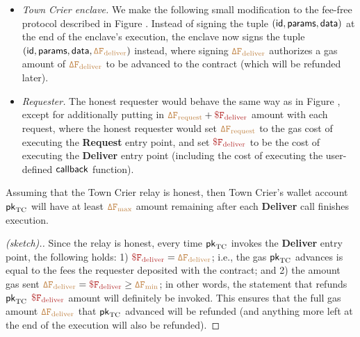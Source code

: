 \begin{itemize}[leftmargin=5mm]
\item
{\it Town Crier enclave.}
We make the following small modification to the fee-free protocol
described in Figure .
Instead of signing the tuple $({\sf id}, {\sf params}, {\sf data})$
at the end of the enclave's execution, the enclave now signs 
the tuple $({\sf id}, {\sf params}, {\sf data}, 
\tt {\color{brown} \Delta F_{\text{deliver}} })$
instead, where signing 
$\tt {\color{brown} \Delta F_{\text{deliver}} }$ authorizes a
gas amount of $\tt {\color{brown} \Delta F_{\text{deliver}} }$ to be advanced
to the contract (which will be refunded later).
\item
{\it Requester.}
The honest requester would behave the same way as in Figure ,
except for additionally putting 
in $\sbrown{\Delta F_{\text{request}}} + \smaroon{\$ F_{\text{deliver}}}$ 
amount with each request, 
where the honest 
requester would set  
$\tt {\color{brown} \Delta F_{\text{request}} }$
to the gas cost of executing the  
{\bf Request} entry point,
and set $\smaroon{\$ F_{\text{deliver}}}$ to be the cost 
of executing the {\bf Deliver} entry point (including
the cost of executing the user-defined ${\sf callback}$ function).
\end{itemize}

\begin{theorem}
Assuming that the Town Crier relay is honest, 
then Town Crier's wallet account ${\sf pk}_{\textrm{TC}}$ 
will have at least $\tt {\color{brown} \Delta F_{\text{max}} }$
amount remaining after each {\bf Deliver}  
call finishes execution.
\end{theorem}
\begin{proof}[(sketch).]
Since the relay is honest, every time 
${\sf pk}_{\textrm{TC}}$ invokes the {\bf Deliver}
entry point, the following holds:
1) 
$\smaroon{\$ F_{\text{deliver}}}
= \sbrown{\Delta F_{\text{deliver}}}$;
i.e., the gas ${\sf pk}_{\textrm{TC}}$ advances is equal
to the fees the 
requester deposited with the \tcont contract;
and 2)
the amount gas sent 
$
\sbrown{\Delta F_{\text{deliver}}} = 
\smaroon{\$ F_{\text{deliver}}}
\geq \sbrown{\Delta F_{\text{min}}}$;
in other words, the statement that refunds
${\sf pk}_{\textrm{TC}}$ 
$\smaroon{\$ F_{\text{deliver}}}$
amount will definitely be invoked. This 
ensures that the full gas amount 
$\tt {\color{brown} \Delta F_{\text{deliver}} }$
that ${\sf pk}_{\textrm{TC}}$ advanced will be refunded (and anything more left
at the end of the execution will also be refunded).
\end{proof}





\begin{theorem}
\end{theorem}



